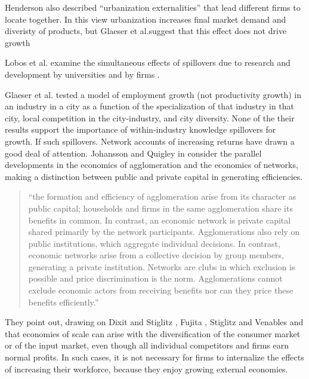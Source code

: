 



Henderson also described ``urbanization externalities'' that lead different firms to locate together. In this view urbanization increases final market demand and diveristy of products, but Glaeser et al.suggest that this effect does not drive growth

Lobos et al. examine the simultaneous effects of spillovers due to research and development by universities and by firms \cite{belderbosWhatSpilloversUniversities2022}.

Glaeser et al.\cite{glaeserGrowthCities1991} tested a model  of employment growth (not productivity growth) in an industry in a city as a function of the specialization of that industry in that city, local competition in the city-industry, and city diversity. None of the their results  support the importance
of within-industry knowledge spillovers for growth. If such spillovers. %
Network accounts of increasing returns have drawn a good deal of attention.
Johansson and Quigley \cite{johanssonAgglomerationNetworksSpatial} in \cite{floraxFiftyYearsRegional2004} consider the parallel developments in the economics of agglomeration and the economics of networks, making a distinction between public and private capital in generating efficiencies.

\begin{quotation}
``the formation and efficiency of agglomeration arise from its character as public capital; households and firms in the same agglomeration share its benefits in common. In contrast, an economic network is private capital shared primarily by the network participants. Agglomerations also rely on public institutions, which aggregate individual decisions. In contrast, economic networks arise from a collective decision by group members, generating a private institution. Networks are clubs in which exclusion is possible and price discrimination is the norm. Agglomerations cannot exclude economic actors from receiving benefits nor can they price these benefits efficiently.''
\end{quotation}
They point out, drawing on Dixit and Stiglitz \cite{AvinashK.Dixit1977MCaO},  Fujita \cite{fujitaMonopolisticCompetitionModel1988}, Stiglitz and Venables and \cite{fujitaSpatialEconomyCities1999} that economies of scale  can arise with the diversification of the consumer market or of the input market, even though all individual competitors and firms earn normal profits. In such cases, it is not necessary for firms to internalize the effects of increasing their workforce, because they enjoy growing external economies.

